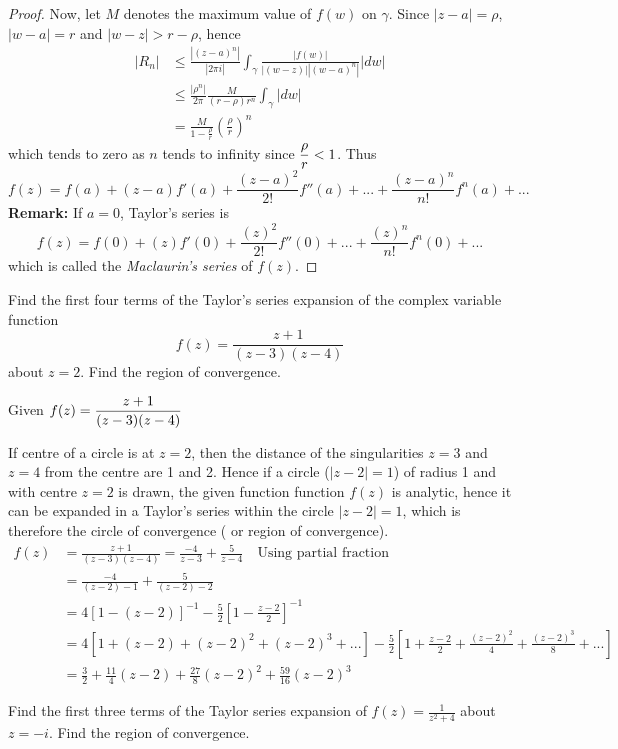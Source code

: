 \begin{proof}
Now, let $M$ denotes the maximum value of $f(w)$ on $\gamma$. Since $|z-a|=\rho$, $|w-a|=r$ and $|w-z| > r - \rho$, hence
\begin{align*}
|R_n| &\leq \frac{|(z-a)^n|}{|2\pi i|} \int_{\gamma} \frac{|f(w)|}{|(w-z)||(w-a)^n|} |dw| \\
&\leq \frac{|\rho^n|}{2\pi} \frac{M}{(r-\rho)r^n}\int_{\gamma}|dw|\\
&= \frac{M}{1-\frac{\rho}{r}} \left(\frac{\rho}{r}\right)^n
\end{align*}
 which tends to zero as $n$ tends to infinity since $\displaystyle \frac{\rho}{r} < 1$. Thus
\[f(z) = f(a) + (z-a)f'(a) + \frac{(z-a)^2}{2!}f''(a) + ... + \frac{(z-a)^n}{n!}f^n(a) + ...\]
\textbf{Remark:} If $a=0$, Taylor's series is
\[f(z) = f(0) + (z)f'(0) + \frac{(z)^2}{2!}f''(0) + ... + \frac{(z)^n}{n!}f^n(0) + ...\]
which is called the \textit{Maclaurin's series} of $f(z)$.
\end{proof}
\begin{example}
Find the first four terms of the Taylor's series expansion of the complex variable function
\[f(z)=\frac{z+1}{(z-3)(z-4)}\]
about $z=2$. Find the region of convergence.
\end{example}
\begin{solution}
Given $\displaystyle f(z)=\frac{z+1}{(z-3)(z-4)}$

\noindent
If  centre of a circle is at $z=2$, then the distance of the singularities $z=3$ and $z=4$ from the centre are 1 and 2. Hence if a circle ($|z-2|=1$) of radius 1 and with centre $z=2$ is drawn, the given function function $f(z)$ is analytic, hence it can be expanded in a Taylor's series within the circle $|z-2|=1$, which is therefore the circle of convergence ( or region of convergence).
\begin{align*}
	f(z) &= \frac{z+1}{(z-3)(z-4)} = \frac{-4}{z-3} + \frac{5}{z-4}~~~\text{ Using partial fraction}\\
	&= \frac{-4}{(z-2)-1} + \frac{5}{(z-2)-2} \\
	&= 4[1-(z-2)]^{-1} - \frac{5}{2}\left[1-\frac{z-2}{2}\right]^{-1} \\
	&= 4[1+(z-2)+(z-2)^2+(z-2)^3 + ...] - \frac{5}{2}\left[1+\frac{z-2}{2}+\frac{(z-2)^2}{4}+\frac{(z-2)^3}{8}+ ...\right] \\
	&= \frac{3}{2} + \frac{11}{4}(z-2) + \frac{27}{8}(z-2)^2 + \frac{59}{16}(z-2)^3
\end{align*}
\end{solution}
\begin{example}
Find the first three terms of the Taylor series expansion of $f(z)=\frac{1}{z^2+4}$ about $z=-i$. Find the region of convergence.
\end{example}
